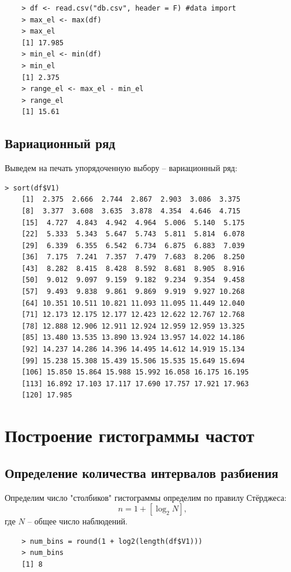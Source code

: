 \documentclass[14pt,a4paper]{scrartcl}
\begin{document}
\begin{lstlisting}
	> df <- read.csv("db.csv", header = F) #data import
	> max_el <- max(df)
	> max_el
	[1] 17.985
	> min_el <- min(df)
	> min_el
	[1] 2.375
	> range_el <- max_el - min_el
	> range_el
	[1] 15.61
\end{lstlisting}
\subsection{Вариационный ряд}
Выведем на печать упорядоченную выбору -- вариационный ряд:
\begin{lstlisting}
> sort(df$V1)
	[1]  2.375  2.666  2.744  2.867  2.903  3.086  3.375
	[8]  3.377  3.608  3.635  3.878  4.354  4.646  4.715
	[15]  4.727  4.843  4.942  4.964  5.006  5.140  5.175
	[22]  5.333  5.343  5.647  5.743  5.811  5.814  6.078
	[29]  6.339  6.355  6.542  6.734  6.875  6.883  7.039
	[36]  7.175  7.241  7.357  7.479  7.683  8.206  8.250
	[43]  8.282  8.415  8.428  8.592  8.681  8.905  8.916
	[50]  9.012  9.097  9.159  9.182  9.234  9.354  9.458
	[57]  9.493  9.838  9.861  9.869  9.919  9.927 10.268
	[64] 10.351 10.511 10.821 11.093 11.095 11.449 12.040
	[71] 12.173 12.175 12.177 12.423 12.622 12.767 12.768
	[78] 12.888 12.906 12.911 12.924 12.959 12.959 13.325
	[85] 13.480 13.535 13.890 13.924 13.957 14.022 14.186
	[92] 14.237 14.286 14.396 14.495 14.612 14.919 15.134
	[99] 15.238 15.308 15.439 15.506 15.535 15.649 15.694
	[106] 15.850 15.864 15.988 15.992 16.058 16.175 16.195
	[113] 16.892 17.103 17.117 17.690 17.757 17.921 17.963
	[120] 17.985
\end{lstlisting}

\section{Построение гистограммы частот}
\subsection{Определение количества интервалов разбиения}
Определим число "столбиков" гистограммы определим по правилу Стёрджеса:
\begin{equation*}
	n = 1 + [\log_2{N}],
\end{equation*}
где $N$ -- общее число наблюдений.


\begin{lstlisting}
	> num_bins = round(1 + log2(length(df$V1)))
	> num_bins
	[1] 8
\end{lstlisting}
\end{document}
